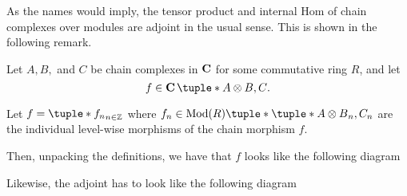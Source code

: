 As the names would imply, the tensor product and internal Hom of chain complexes over modules are adjoint in the usual sense. This is shown in the following remark.

\begin{remark}
    \label{rem:tensor_prod_internal_hom_adjoint}
    Let \( A, B, \) and \( C \) be chain complexes in \( \operatorname{\mathbf{C}} \) for some commutative ring \( R \), and let
    \[
        f \in \C\tuple*{A \otimes B, C}.
    \]
    
    Let \( f = \tuple*{f_n}_{n \in \Zb} \) where \( f_n \in \Mod(R)\tuple*{ \tuple*{A \otimes B}_n, C_n} \) are the individual level-wise morphisms of the chain morphism \( f \).

    Then, unpacking the definitions, we have that \( f \) looks like the following diagram
    \begin{center}
    \end{center}
    Likewise, the adjoint has to look like the following diagram
    \begin{center}
\end{center}
\end{remark}
